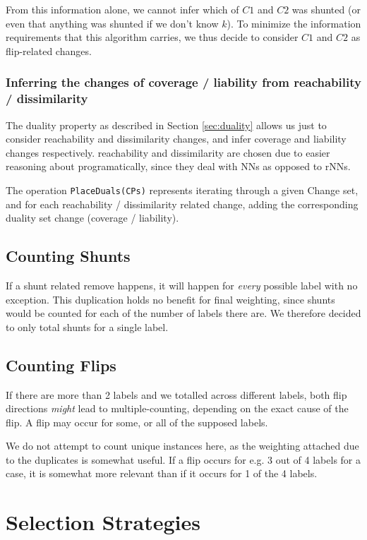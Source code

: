 \documentclass[a4paper,11pt]{report}
\begin{document}
From this information alone, we cannot infer which of $C1$ and $C2$ was shunted (or even that anything was shunted if we don't know $k$). To minimize the information requirements that this algorithm carries, we thus decide to consider $C1$ and $C2$ as flip-related changes.

\subsubsection{Inferring the changes of coverage / liability from reachability / dissimilarity}
The duality property as described in Section \ref{sec:duality} allows us just to consider reachability and dissimilarity changes, and infer coverage and liability changes respectively. reachability and dissimilarity are chosen due to easier reasoning about programatically, since they deal with NNs as opposed to rNNs.

The operation \verb!PlaceDuals(CPs)! represents iterating through a given Change set, and for each reachability / dissimilarity related change, adding the corresponding duality set change (coverage / liability).

\subsection{Counting Shunts}
If a shunt related remove happens, it will happen for \emph{every} possible label with no exception. This duplication holds no benefit for final weighting, since shunts would be counted for each of the number of labels there are. We therefore decided to only total shunts for a single label.

\subsection{Counting Flips}
If there are more than 2 labels and we totalled across different labels, both flip directions \emph{might} lead to multiple-counting, depending on the exact cause of the flip. A flip may occur for some, or all of the supposed labels.

We do not attempt to count unique instances here, as the weighting attached due to the duplicates is somewhat useful. If a flip occurs for e.g. 3 out of 4 labels for a case, it is somewhat more relevant than if it occurs for 1 of the 4 labels.

\section{Selection Strategies}
\end{document}
